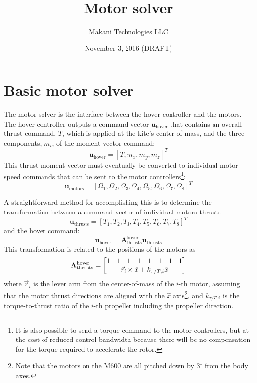 \documentclass[11pt]{amsart}
\title{Motor solver}
\author{Makani Technologies LLC}
\date{November 3, 2016\; (DRAFT)}
\newcommand{\Athrustshover}{\mathbf{A}_{\mathrm{thrusts}}^{\mathrm{hover}}}
\begin{document}
\maketitle

\section{Basic motor solver}

The motor solver is the interface between the hover controller and the
motors.  The hover controller outputs a command vector
$\mathbf{u_{\mathrm{hover}}}$ that contains an overall thrust command,
$T$, which is applied at the kite's center-of-mass, and the three
components, $m_i$, of the moment vector command:
%
\begin{equation}
  \label{eqn:hover_command}
  \mathbf{u_{\mathrm{hover}}} = [T, m_x, m_y, m_z]^T
\end{equation}
%
This thrust-moment vector must eventually be converted to individual
motor speed commands that can be sent to the motor
controllers\footnote{It is also possible to send a torque command to
  the motor controllers, but at the cost of reduced control bandwidth
  because there will be no compensation for the torque required to
  accelerate the rotor.}:
%
\begin{equation}
  \label{eqn:motors_command}
  \mathbf{u_{\mathrm{motors}}} = [\Omega_1, \Omega_2, \Omega_3, \Omega_4,
                                  \Omega_5, \Omega_6, \Omega_7, \Omega_8]^T
\end{equation}

A straightforward method for accomplishing this is to determine the
transformation between a command vector of individual motors thrusts
%
\begin{equation}
  \label{eqn:thrusts_command}
  \mathbf{u_{\mathrm{thrusts}}} = [T_1, T_2, T_3, T_4, T_5, T_6, T_7, T_8]^T
\end{equation}
%
and the hover command:
%
\begin{equation}
  \mathbf{u_{\mathrm{hover}}} = \Athrustshover \mathbf{u_{\mathrm{thrusts}}}
\end{equation}
%
This transformation is related to the positions of the motors as
%
\begin{equation}
  \Athrustshover =
  \begin{bmatrix}
    1 & 1 & 1 & 1 & 1 & 1 & 1 & 1 \\
    \multicolumn{8}{c}{\vec{r}_i \times \hat{x} + k_{\tau/T, i}
      \hat{x}}
  \end{bmatrix}
\end{equation}
%
where $\vec{r}_i$ is the lever arm from the center-of-mass of the
$i$-th motor, assuming that the motor thrust directions are aligned
with the $\hat{x}$ axis\footnote{Note that the motors on the M600 are
  all pitched down by 3$^\circ$ from the body axes.}, and
$k_{\tau/T, i}$ is the torque-to-thrust ratio of the $i$-th propeller
including the propeller direction.
\end{document}
